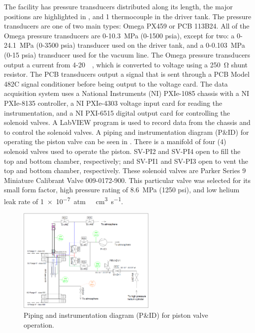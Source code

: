 The facility has pressure transducers distributed along its length, the major positions are highlighted in , and 1 thermocouple in the driver tank. The pressure transducers are one of two main types: Omega PX459 or PCB 113B24. All of the Omega pressure transducers are 0-\SI{10.3}{\mega\pascal} (0-1500 psia), except for two: a 0-\SI{24.1}{\mega\pascal} (0-3500 psia) transducer used on the driver tank, and a 0-\SI{0.103}{\mega\pascal} (0-15 psia) transducer used for the vacuum line. The Omega pressure transducers output a current from 4-\SI{20}{\milli\amp}, which is converted to voltage using a \SI{250}{\ohm} shunt resistor. The PCB transducers output a signal that is sent through a PCB Model 482C signal conditioner before being output to the voltage card. The data acquisition system uses a National Instruments (NI) PXIe-1085 chassis with a NI PXIe-8135 controller, a NI PXIe-4303 voltage input card for reading the instrumentation, and a NI PXI-6515 digital output card for controlling the solenoid valves. A LabVIEW program is used to record data from the chassis and to control the solenoid valves. A piping and instrumentation diagram (P\&ID) for operating the piston valve can be seen in . There is a manifold of four (4) solenoid valves used to operate the piston. SV-PI2 and SV-PI4 open to fill the top and bottom chamber, respectively; and SV-PI1 and SV-PI3 open to vent the top and bottom chamber, respectively. These solenoid valves are Parker Series 9 Miniature Calibrant Valve 009-0172-900. This particular valve was selected for its small form factor, high pressure rating of \SI{8.6}{\mega\pascal} (1250 psi), and low helium leak rate of \SI{1e-7}{atm\ \centi\meter^3\per\second}.



%
\begin{figure}[tb]
    \vspace{16pt}
    \centering
    \includegraphics[width=0.6\textwidth]{experiment/photos/HENRI_valve_PID.PNG}
    \caption{Piping and instrumentation diagram (P\&ID) for piston valve operation.}
    \label{fig:sv pid}
    \vspace{16pt}
\end{figure}
%




